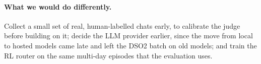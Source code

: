\paragraph{What we would do differently.} Collect a small set of real, human-labelled chats early, to calibrate
the judge before building on it; decide the LLM provider earlier, since the move from local to hosted models
came late and left the DSO2 batch on old models; and train the RL router on the same multi-day episodes that
the evaluation uses.
